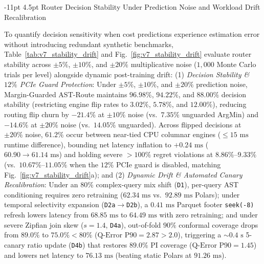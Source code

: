 \documentclass[10pt,a4paper]{article}
\makeatletter
\renewcommand\subsubsection{\@startsection{subsubsection}{3}{\z@}%
  {-11pt \@plus -2.5pt \@minus -1pt}%
  {4.5pt \@plus 1pt}%
  {\normalfont\normalsize\bfseries}}
\makeatother
\begin{document}
\subsubsection{Router Decision Stability Under Prediction Noise and Workload Drift Recalibration}

To quantify decision sensitivity when cost predictions experience estimation error without introducing redundant synthetic benchmarks, Table~\ref{tab:v7_stability_drift} and Fig.~\ref{fig:v7_stability_drift} evaluate router stability across $\pm 5\%$, $\pm 10\%$, and $\pm 20\%$ multiplicative noise ($1{,}000$ Monte Carlo trials per level) alongside dynamic post-training drift:
(1) \emph{Decision Stability \& $12\%$ PCIe Guard Protection}: Under $\pm 5\%$, $\pm 10\%$, and $\pm 20\%$ prediction noise, Margin-Guarded AST-Route maintains $96.98\%$, $94.22\%$, and $88.00\%$ decision stability (restricting engine flip rates to $3.02\%$, $\mathbf{5.78\%}$, and $\mathbf{12.00\%}$), reducing routing flip churn by $\mathbf{-21.4\%}$ at $\pm 10\%$ noise (vs.\ $7.35\%$ unguarded ArgMin) and $\mathbf{-14.6\%}$ at $\pm 20\%$ noise (vs.\ $14.05\%$ unguarded). Across flipped decisions at $\pm 20\%$ noise, $61.2\%$ occur between near-tied CPU columnar engines ($\le 15\text{ ms}$ runtime difference), bounding net latency inflation to $+0.24\text{ ms}$ ($60.90 \rightarrow 61.14\text{ ms}$) and holding severe $>100\%$ regret violations at $8.86\%\text{--}9.33\%$ (vs.\ $10.67\%\text{--}11.05\%$ when the $12\%$ PCIe guard is disabled, matching Fig.~\ref{fig:v7_stability_drift}a); and
(2) \emph{Dynamic Drift \& Automated Canary Recalibration}: Under an $80\%$ complex-query mix shift (\texttt{D1}), per-query AST conditioning requires zero retraining ($62.34\text{ ms}$ vs.\ $92.89\text{ ms}$ Polars); under temporal selectivity expansion (\texttt{D2a}$\rightarrow$\texttt{D2b}), a $0.41\text{ ms}$ Parquet footer \texttt{seek(-8)} refresh lowers latency from $68.85\text{ ms}$ to $64.49\text{ ms}$ with zero retraining; and under severe Zipfian join skew ($s=1.4$, \texttt{D4a}), out-of-fold $90\%$ conformal coverage drops from $89.0\%$ to $75.0\% < 80\%$ ($\text{Q-Error P90} = 2.87 > 2.0$), triggering a $\sim 0.4\text{ s}$ 5-canary ratio update (\texttt{D4b}) that restores $89.0\%$ PI coverage ($\text{Q-Error P90} = 1.45$) and lowers net latency to $76.13\text{ ms}$ (beating static Polars at $91.26\text{ ms}$).
\end{document}
